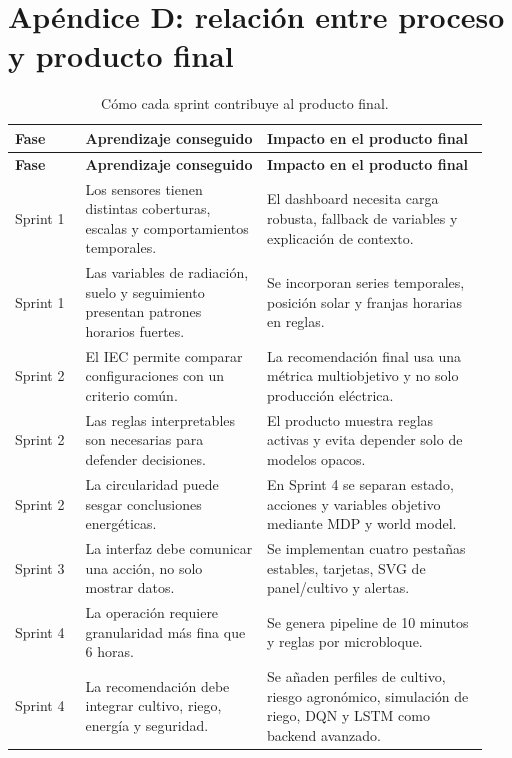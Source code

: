 ﻿\documentclass[11pt,a4paper]{article}
\begin{document}
\section{Apéndice D: relación entre proceso y producto final}

\begin{longtable}{p{0.14\linewidth}p{0.36\linewidth}p{0.44\linewidth}}
\caption{Cómo cada sprint contribuye al producto final.}\\
\toprule
\textbf{Fase} & \textbf{Aprendizaje conseguido} & \textbf{Impacto en el producto final} \\
\midrule
\endfirsthead
\toprule
\textbf{Fase} & \textbf{Aprendizaje conseguido} & \textbf{Impacto en el producto final} \\
\midrule
\endhead
Sprint 1 & Los sensores tienen distintas coberturas, escalas y comportamientos temporales. & El dashboard necesita carga robusta, fallback de variables y explicación de contexto. \\ \addlinespace
Sprint 1 & Las variables de radiación, suelo y seguimiento presentan patrones horarios fuertes. & Se incorporan series temporales, posición solar y franjas horarias en reglas. \\ \addlinespace
Sprint 2 & El IEC permite comparar configuraciones con un criterio común. & La recomendación final usa una métrica multiobjetivo y no solo producción eléctrica. \\ \addlinespace
Sprint 2 & Las reglas interpretables son necesarias para defender decisiones. & El producto muestra reglas activas y evita depender solo de modelos opacos. \\ \addlinespace
Sprint 2 & La circularidad puede sesgar conclusiones energéticas. & En Sprint 4 se separan estado, acciones y variables objetivo mediante MDP y world model. \\ \addlinespace
Sprint 3 & La interfaz debe comunicar una acción, no solo mostrar datos. & Se implementan cuatro pestañas estables, tarjetas, SVG de panel/cultivo y alertas. \\ \addlinespace
Sprint 4 & La operación requiere granularidad más fina que 6 horas. & Se genera pipeline de 10 minutos y reglas por microbloque. \\ \addlinespace
Sprint 4 & La recomendación debe integrar cultivo, riego, energía y seguridad. & Se añaden perfiles de cultivo, riesgo agronómico, simulación de riego, DQN y LSTM como backend avanzado. \\
\bottomrule
\end{longtable}
\end{document}
